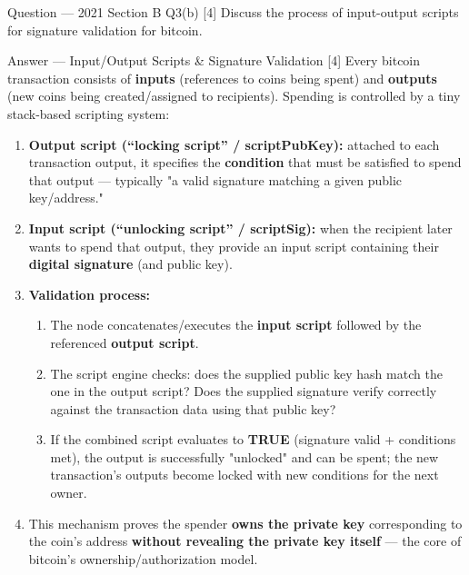 \documentclass[12pt,a4paper]{article}
\begin{document}
\begin{qbox}{Question --- 2021 Section B Q3(b) [4]}
Discuss the process of input-output scripts for signature validation for bitcoin.
\end{qbox}

\begin{solbox}{Answer --- Input/Output Scripts \& Signature Validation [4]}
Every bitcoin transaction consists of \textbf{inputs} (references to coins being spent) and \textbf{outputs} (new coins being created/assigned to recipients). Spending is controlled by a tiny stack-based scripting system:

\begin{enumerate}[noitemsep]
  \item \textbf{Output script (``locking script'' / scriptPubKey):} attached to each transaction output, it specifies the \textbf{condition} that must be satisfied to spend that output --- typically "a valid signature matching a given public key/address."
  \item \textbf{Input script (``unlocking script'' / scriptSig):} when the recipient later wants to spend that output, they provide an input script containing their \textbf{digital signature} (and public key).
  \item \textbf{Validation process:}
  \begin{enumerate}[noitemsep]
    \item The node concatenates/executes the \textbf{input script} followed by the referenced \textbf{output script}.
    \item The script engine checks: does the supplied public key hash match the one in the output script? Does the supplied signature verify correctly against the transaction data using that public key?
    \item If the combined script evaluates to \textbf{TRUE} (signature valid + conditions met), the output is successfully "unlocked" and can be spent; the new transaction's outputs become locked with new conditions for the next owner.
  \end{enumerate}
  \item This mechanism proves the spender \textbf{owns the private key} corresponding to the coin's address \textbf{without revealing the private key itself} --- the core of bitcoin's ownership/authorization model.
\end{enumerate}
\end{solbox}

\end{document}
